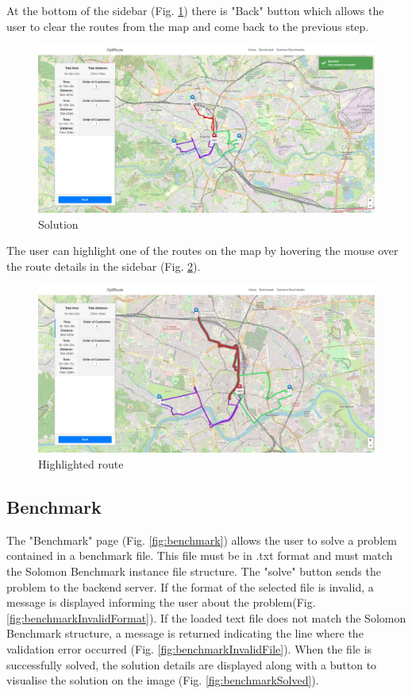 \documentclass[a4paper,twoside,12pt]{book}
\begin{document}
At the bottom of the sidebar (Fig. \ref{fig:solution}) there is "Back" button which allows the user to clear the routes from the map and come back to the previous step.

\begin{figure}[H]
\centering
\includegraphics[scale=0.3]{images/solution.jpg}
\caption{Solution}
\label{fig:solution}
\end{figure}

The user can highlight one of the routes on the map by hovering the mouse over the route details in the sidebar (Fig. \ref{fig:solutionHover}).

\begin{figure}[H]
\centering
\includegraphics[scale=0.3]{images/solutionHover.jpg}
\caption{Highlighted route}
\label{fig:solutionHover}
\end{figure}

\subsection{Benchmark}

The "Benchmark" page (Fig. \ref{fig:benchmark}) allows the user to solve a problem contained in a benchmark file. This file must be in .txt format and must match the Solomon Benchmark instance file structure. The "solve" button sends the problem to the backend server. If the format of the selected file is invalid, a message is displayed informing the user about the problem(Fig. \ref{fig:benchmarkInvalidFormat}). If the loaded text file does not match the Solomon Benchmark structure, a message is returned indicating the line where the validation error occurred (Fig. \ref{fig:benchmarkInvalidFile}).  When the file is successfully solved, the solution details are displayed along with a button to visualise the solution on the image (Fig. \ref{fig:benchmarkSolved}).
\end{document}
